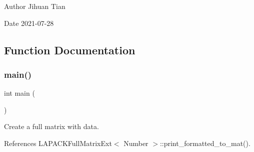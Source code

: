 \begin{DoxyAuthor}{Author}
Jihuan Tian 
\end{DoxyAuthor}
\begin{DoxyDate}{Date}
2021-\/07-\/28 
\end{DoxyDate}


\subsection{Function Documentation}
\mbox{\label{lapack-matrix-global-to-submatrix_8cc_ae66f6b31b5ad750f1fe042a706a4e3d4}} 
\subsubsection{\texorpdfstring{main()}{main()}}
{\footnotesize\ttfamily int main (\begin{DoxyParamCaption}{ }\end{DoxyParamCaption})}

Create a full matrix with data.

References L\+A\+P\+A\+C\+K\+Full\+Matrix\+Ext$<$ Number $>$\+::print\+\_\+formatted\+\_\+to\+\_\+mat().

